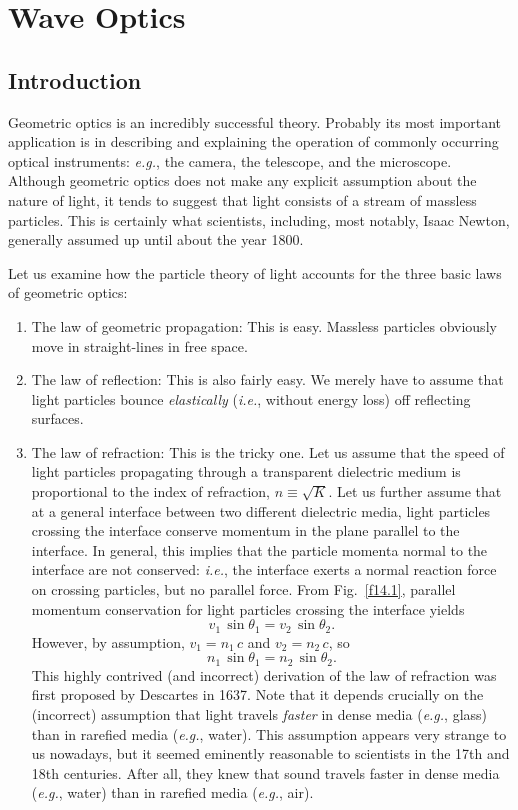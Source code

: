 \section{Wave Optics}\label{s13}
\subsection{Introduction}\label{s14.1}
Geometric optics is an incredibly successful theory. Probably its
most important application  is in describing and explaining
 the operation of 
 commonly occurring  optical instruments: {\em 
e.g.}, the camera, the telescope, and the microscope. 
Although geometric optics does not make any explicit  assumption about
the nature of light, it tends to suggest that light consists of a
stream of massless particles. This is certainly what scientists, including,
most notably, Isaac Newton,  
generally assumed up until about the year 1800.

Let us examine how the particle theory of light accounts for the three basic
laws of geometric optics:
\begin{enumerate}
\item{\sf The law of geometric propagation:} This is easy. Massless
particles obviously move in straight-lines in free space.
\item{\sf The law of reflection:} This is also fairly easy. We merely
have to assume that light particles bounce {\em elastically}\/
({\em i.e.}, without energy loss) off reflecting surfaces. 
\item {\sf The law of refraction:} This is the tricky one. Let us
assume that the speed of light particles propagating through a transparent
dielectric medium is proportional to the 
index of refraction, $n\equiv \sqrt{K}$. 
Let us further assume that at a general 
 interface between two different dielectric
media,  light particles crossing the interface conserve
momentum in the plane parallel to the interface. In general, this implies
that the particle momenta normal to the interface are not conserved:
{\em i.e.}, the interface exerts a normal reaction force on crossing
particles, but no parallel force. From Fig.~\ref{f14.1}, 
parallel momentum conservation for  light particles crossing the interface
yields
\begin{equation}
v_1\,\sin\theta_1 = v_2\,\sin\theta_2.
\end{equation}
However, by assumption, $v_1=n_1\,c$ and $v_2=n_2\,c$, so
\begin{equation}
n_1\,\sin\theta_1 = n_2\,\sin\theta_2.
\end{equation}
This highly contrived (and incorrect) derivation of the law of refraction
was first proposed by Descartes in 1637. Note that it depends
crucially on the (incorrect) assumption that light travels
{\em faster}\/ in dense media ({\em e.g.}, glass)
than in rarefied media ({\em e.g.}, water). This assumption
 appears very strange to us nowadays, but it seemed eminently reasonable
to scientists in the 17th and 18th centuries. After all, they knew that
sound travels faster in dense media ({\em e.g.}, water) than in rarefied
media ({\em e.g.}, air). 
\end{enumerate}

